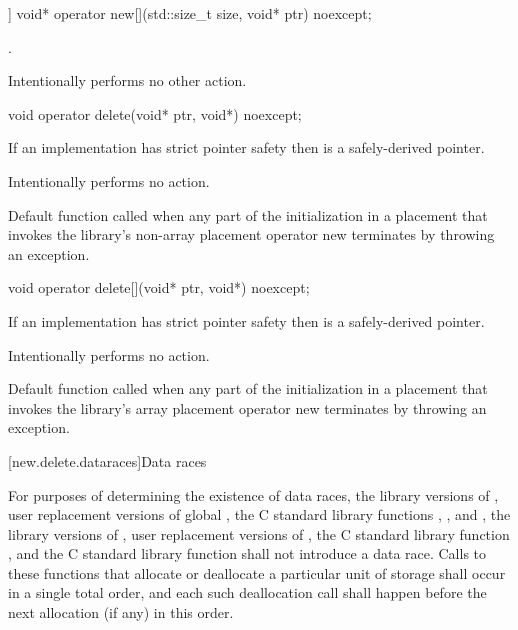 %
\begin{itemdecl}
[[nodiscard]] void* operator new[](std::size_t size, void* ptr) noexcept;
\end{itemdecl}

\begin{itemdescr}
\pnum
\returns
{}.

\pnum
\remarks
Intentionally performs no other action.
\end{itemdescr}

%
\begin{itemdecl}
void operator delete(void* ptr, void*) noexcept;
\end{itemdecl}

\begin{itemdescr}
\pnum
\expects
If an implementation has strict pointer safety
then  is a safely-derived pointer.

\pnum
\effects
Intentionally performs no action.

\pnum
\remarks
Default function called when any part of the initialization in a
placement  that invokes the library's
non-array placement operator new
terminates by throwing an exception.
\end{itemdescr}

%
\begin{itemdecl}
void operator delete[](void* ptr, void*) noexcept;
\end{itemdecl}

\begin{itemdescr}
\pnum
\expects
If an implementation has strict pointer safety
then  is a safely-derived pointer.

\pnum
\effects
Intentionally performs no action.

\pnum
\remarks
Default function called when any part of the initialization in a
placement  that invokes the library's
array placement operator new
terminates by throwing an exception.
\end{itemdescr}

[new.delete.dataraces]{Data races}

\pnum
For purposes of determining the existence of data races, the library versions
of , user replacement versions of global ,
the C standard library functions
, , and ,
the library
versions of , user replacement
versions of , the C standard library function
, and the C standard library function  shall not
introduce a data race.
Calls to these functions that allocate or deallocate a particular unit
of storage shall occur in a single total order, and each such deallocation call
shall happen before the next allocation (if any) in
this order.

